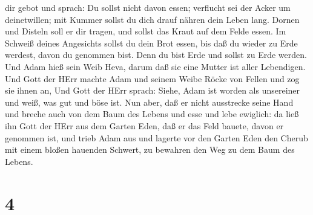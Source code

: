 dir gebot und sprach: Du sollst nicht davon essen; verflucht sei der
Acker um deinetwillen; mit Kummer sollst du dich drauf nähren dein Leben
lang.  Dornen und Disteln soll er dir tragen, und sollst
das Kraut auf dem Felde essen.  Im Schweiß deines
Angesichts sollst du dein Brot essen, bis daß du wieder zu Erde werdest,
davon du genommen bist. Denn du bist Erde und sollst zu Erde werden.
 Und Adam hieß sein Weib Heva, darum daß sie eine Mutter
ist aller Lebendigen.  Und Gott der HErr machte Adam und
seinem Weibe Röcke von Fellen und zog sie ihnen an,  Und
Gott der HErr sprach: Siehe, Adam ist worden als unsereiner und weiß,
was gut und böse ist. Nun aber, daß er nicht ausstrecke seine Hand und
breche auch von dem Baum des Lebens und esse und lebe ewiglich:
 da ließ ihn Gott der HErr aus dem Garten Eden, daß er das
Feld bauete, davon er genommen ist,  und trieb Adam aus und
lagerte vor den Garten Eden den Cherub mit einem bloßen hauenden
Schwert, zu bewahren den Weg zu dem Baum des Lebens.

\hypertarget{section-3}{%
\section{4}\label{section-3}}

